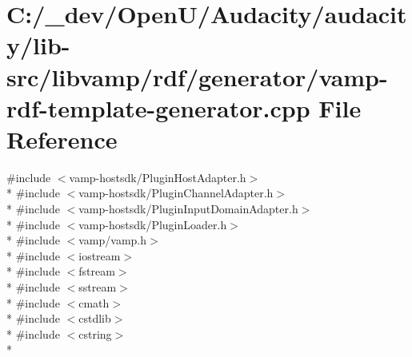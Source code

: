 \hypertarget{vamp-rdf-template-generator_8cpp}{}\section{C\+:/\+\_\+dev/\+Open\+U/\+Audacity/audacity/lib-\/src/libvamp/rdf/generator/vamp-\/rdf-\/template-\/generator.cpp File Reference}
\label{vamp-rdf-template-generator_8cpp}
{\ttfamily \#include $<$vamp-\/hostsdk/\+Plugin\+Host\+Adapter.\+h$>$}\\*
{\ttfamily \#include $<$vamp-\/hostsdk/\+Plugin\+Channel\+Adapter.\+h$>$}\\*
{\ttfamily \#include $<$vamp-\/hostsdk/\+Plugin\+Input\+Domain\+Adapter.\+h$>$}\\*
{\ttfamily \#include $<$vamp-\/hostsdk/\+Plugin\+Loader.\+h$>$}\\*
{\ttfamily \#include $<$vamp/vamp.\+h$>$}\\*
{\ttfamily \#include $<$iostream$>$}\\*
{\ttfamily \#include $<$fstream$>$}\\*
{\ttfamily \#include $<$sstream$>$}\\*
{\ttfamily \#include $<$cmath$>$}\\*
{\ttfamily \#include $<$cstdlib$>$}\\*
{\ttfamily \#include $<$cstring$>$}\\*
